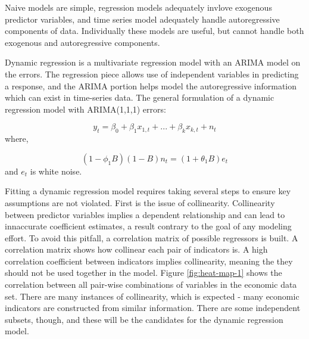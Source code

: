 \documentclass[12pt,letterpaper,toc=flat,oneside]{report}
\theoremstyle{definition}
\theoremstyle{definition}
\theoremstyle{definition}
\theoremstyle{remark}
\begin{document}
Naive models are simple, regression models adequately invlove exogenous
predictor variables, and time series model adequately handle
autoregressive components of data. Individually these models are useful,
but cannot handle both exogenous and autoregressive components.

Dynamic regression is a multivariate regression model with an ARIMA
model on the errors. The regression piece allows use of independent
variables in predicting a response, and the ARIMA portion helps model
the autoregressive information which can exist in time-series data. The
general formulation of a dynamic regression model with ARIMA(1,1,1)
errors:

\[ y_t = \beta_0 + \beta_1x_{1,t} + ... + \beta_kx_{k,t} + n_t\] where,

\[ (1-\phi_1B)(1-B)n_t = (1+\theta_1B)e_t \] and \(e_t\) is white noise.

Fitting a dynamic regression model requires taking several steps to
ensure key assumptions are not violated. First is the issue of
collinearity. Collinearity between predictor variables implies a
dependent relationship and can lead to innaccurate coefficient
estimates, a result contrary to the goal of any modeling effort. To
avoid this pitfall, a correlation matrix of possible regressors is
built. A correlation matrix shows how collinear each pair of indicators
is. A high correlation coefficient between indicators implies
collinearity, meaning the they should not be used together in the model.
Figure \ref{fig:heat-map-1} shows the correlation between all pair-wise
combinations of variables in the economic data set. There are many
instances of collinearity, which is expected - many economic indicators
are constructed from similar information. There are some independent
subsets, though, and these will be the candidates for the dynamic
regression model.
\end{document}
